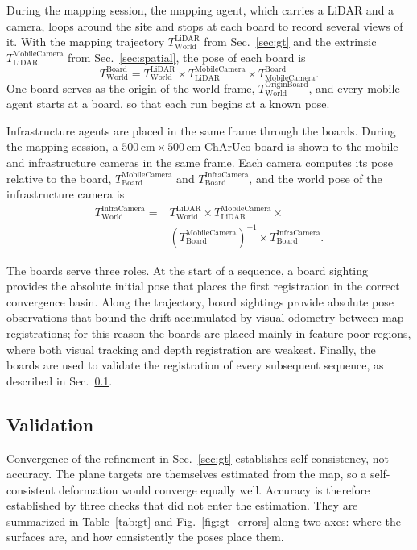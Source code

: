 \documentclass[conference]{IEEEtran}
\newcommand{\Ttransform}[2]{\ensuremath{T_{\mathrm{#1}}^{\mathrm{#2}}}}
\begin{document}
During the mapping session, the mapping agent, which carries a LiDAR
and a camera, loops around the site and stops at each board to
record several views of it. With the mapping trajectory
\Ttransform{World}{LiDAR} from Sec.~\ref{sec:gt} and the extrinsic
\Ttransform{LiDAR}{MobileCamera} from Sec.~\ref{sec:spatial}, the
pose of each board is
\begin{equation}
   \Ttransform{World}{Board} = \Ttransform{World}{LiDAR} \times \Ttransform{LiDAR}{MobileCamera} \times \Ttransform{MobileCamera}{Board} .
   \label{eq:board_chain}
\end{equation}
One board serves as the origin of the world frame,
\Ttransform{World}{OriginBoard}, and every mobile agent starts at a
board, so that each run begins at a known pose.

Infrastructure agents are placed in the same frame through the
boards. During the mapping session, a
\(500\,\mathrm{cm} \times 500\,\mathrm{cm}\) ChArUco board is shown to
the mobile and infrastructure cameras in the same frame. Each camera
computes its pose relative to the board,
\Ttransform{Board}{MobileCamera} and \Ttransform{Board}{InfraCamera},
and the world pose of the infrastructure camera is
\begin{equation}
\begin{split}
  \Ttransform{World}{InfraCamera} = {}
    & \Ttransform{World}{LiDAR} \times \Ttransform{LiDAR}{MobileCamera} \times \\
    &  (\Ttransform{Board}{MobileCamera})^{-1} \times \Ttransform{Board}{InfraCamera} .
\end{split}
\label{eq:infra_camera_chain}
\end{equation}

The boards serve three roles. At the start of a sequence, a board
sighting provides the absolute initial pose that places the first
registration in the correct convergence basin. Along the trajectory,
board sightings provide absolute pose observations that bound the
drift accumulated by visual odometry between map registrations; for
this reason the boards are placed mainly in feature-poor regions,
where both visual tracking and depth registration are weakest.
Finally, the boards are used to validate the registration of every
subsequent sequence, as described in Sec.~\ref{sec:gt_val}.

\subsection{Validation}
\label{sec:gt_val}
Convergence of the refinement in Sec.~\ref{sec:gt} establishes
self-consistency, not accuracy. The plane targets are themselves
estimated from the map, so a self-consistent deformation would
converge equally well. Accuracy is therefore established by three
checks that did not enter the estimation. They are summarized in
Table~\ref{tab:gt} and Fig.~\ref{fig:gt_errors} along two axes: where
the surfaces are, and how consistently the poses place them.
\end{document}
